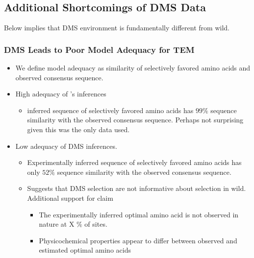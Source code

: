 \documentclass[12pt]{article}
\begin{document}
\begin{itemize}
\subsection*{Additional Shortcomings of DMS Data}
Below implies that DMS environment is fundamentally different from wild.
\subsubsection*{DMS Leads to Poor Model Adequacy for TEM}
\begin{itemize}
\item We define model adequacy as similarity of selectively favored amino acids and observed consensus sequence.
\item High adequacy of \selac's inferences
  \begin{itemize}
  \item \selac inferred sequence of selectively favored amino acids has $99 \%$ sequence similarity with the observed consensus sequence.
    Perhaps not surprising given this was the only data \selac used.
  \end{itemize}
\item Low adequacy of DMS inferences.
  \begin{itemize}
  \item Experimentally inferred sequence of selectively favored amino acids has only $52 \%$ sequence similarity with the observed consensus sequence.
  \item Suggests that DMS selection are not informative about selection in wild.
    Additional support for claim
    \begin{itemize}
    \item The experimentally inferred optimal amino acid is not observed in nature at X \% of sites.
    \item Physicochemical properties appear to differ between observed and estimated optimal amino acids
    \end{itemize}
  \end{itemize}
\end{itemize}


\end{itemize}
\end{document}
